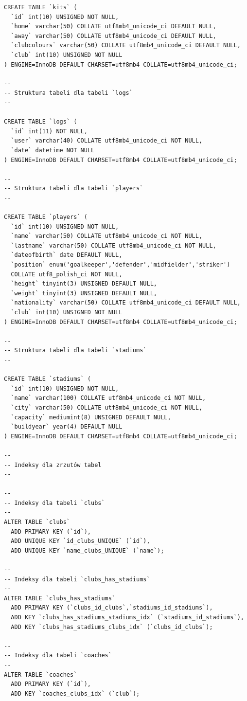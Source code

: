 \documentclass[12pt,a4paper]{article}
\begin{document}
\begin{verbatim}
CREATE TABLE `kits` (
  `id` int(10) UNSIGNED NOT NULL,
  `home` varchar(50) COLLATE utf8mb4_unicode_ci DEFAULT NULL,
  `away` varchar(50) COLLATE utf8mb4_unicode_ci DEFAULT NULL,
  `clubcolours` varchar(50) COLLATE utf8mb4_unicode_ci DEFAULT NULL,
  `club` int(10) UNSIGNED NOT NULL
) ENGINE=InnoDB DEFAULT CHARSET=utf8mb4 COLLATE=utf8mb4_unicode_ci;

--
-- Struktura tabeli dla tabeli `logs`
--

CREATE TABLE `logs` (
  `id` int(11) NOT NULL,
  `user` varchar(40) COLLATE utf8mb4_unicode_ci NOT NULL,
  `date` datetime NOT NULL
) ENGINE=InnoDB DEFAULT CHARSET=utf8mb4 COLLATE=utf8mb4_unicode_ci;

--
-- Struktura tabeli dla tabeli `players`
--

CREATE TABLE `players` (
  `id` int(10) UNSIGNED NOT NULL,
  `name` varchar(50) COLLATE utf8mb4_unicode_ci NOT NULL,
  `lastname` varchar(50) COLLATE utf8mb4_unicode_ci NOT NULL,
  `dateofbirth` date DEFAULT NULL,
  `position` enum('goalkeeper','defender','midfielder','striker') 
  COLLATE utf8_polish_ci NOT NULL,
  `height` tinyint(3) UNSIGNED DEFAULT NULL,
  `weight` tinyint(3) UNSIGNED DEFAULT NULL,
  `nationality` varchar(50) COLLATE utf8mb4_unicode_ci DEFAULT NULL,
  `club` int(10) UNSIGNED NOT NULL
) ENGINE=InnoDB DEFAULT CHARSET=utf8mb4 COLLATE=utf8mb4_unicode_ci;

--
-- Struktura tabeli dla tabeli `stadiums`
--

CREATE TABLE `stadiums` (
  `id` int(10) UNSIGNED NOT NULL,
  `name` varchar(100) COLLATE utf8mb4_unicode_ci NOT NULL,
  `city` varchar(50) COLLATE utf8mb4_unicode_ci NOT NULL,
  `capacity` mediumint(8) UNSIGNED DEFAULT NULL,
  `buildyear` year(4) DEFAULT NULL
) ENGINE=InnoDB DEFAULT CHARSET=utf8mb4 COLLATE=utf8mb4_unicode_ci;

--
-- Indeksy dla zrzutów tabel
--

--
-- Indeksy dla tabeli `clubs`
--
ALTER TABLE `clubs`
  ADD PRIMARY KEY (`id`),
  ADD UNIQUE KEY `id_clubs_UNIQUE` (`id`),
  ADD UNIQUE KEY `name_clubs_UNIQUE` (`name`);

--
-- Indeksy dla tabeli `clubs_has_stadiums`
--
ALTER TABLE `clubs_has_stadiums`
  ADD PRIMARY KEY (`clubs_id_clubs`,`stadiums_id_stadiums`),
  ADD KEY `clubs_has_stadiums_stadiums_idx` (`stadiums_id_stadiums`),
  ADD KEY `clubs_has_stadiums_clubs_idx` (`clubs_id_clubs`);

--
-- Indeksy dla tabeli `coaches`
--
ALTER TABLE `coaches`
  ADD PRIMARY KEY (`id`),
  ADD KEY `coaches_clubs_idx` (`club`);


\end{verbatim}
\end{document}
